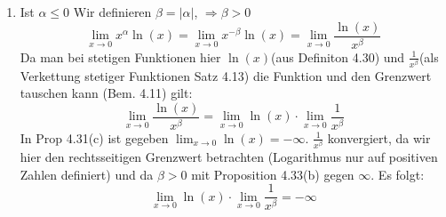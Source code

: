 \documentclass{article}
\begin{document}
\begin{enumerate}[ label = (\roman*) ]
\begin{enumerate}[ label = \arabic*. Fall]
            \item Ist \(\alpha \leq 0\)
            Wir definieren \(\beta = |\alpha| \), \(\Rightarrow \beta > 0\)
            \[\lim_{x \to 0} x^{\alpha} \ln(x) = \lim_{x \to 0}  x^{-\beta} \ln(x) = \lim_{x \to 0} \frac{\ln(x)}{x^{\beta}} \]
            Da man bei stetigen Funktionen hier \(\ln(x)\)(aus Definiton 4.30) und \(\frac{1}{x^{\beta}}\)(als Verkettung stetiger Funktionen Satz 4.13)
            die Funktion und den Grenzwert tauschen kann (Bem. 4.11) gilt:
            \[ \lim_{x \to 0} \frac{\ln(x)}{x^{\beta}} = \lim_{x \to 0} \ln(x) \cdot \lim_{x \to 0} \frac{1}{x^{\beta}}\]
            In Prop 4.31(c) ist gegeben \(\lim_{x \to 0} \ln(x) = -\infty \).
            \(\frac{1}{x^{\beta}}\) konvergiert, da wir hier den rechtsseitigen Grenzwert betrachten (Logarithmus nur auf positiven Zahlen definiert)
            und da \(\beta > 0\) mit Proposition 4.33(b) gegen \( \infty \).
            Es folgt:
            \[\lim_{x \to 0} \ln(x) \cdot \lim_{x \to 0} \frac{1}{x^{\beta}} = - \infty \]

        \end{enumerate}


\end{enumerate}
\end{document}

